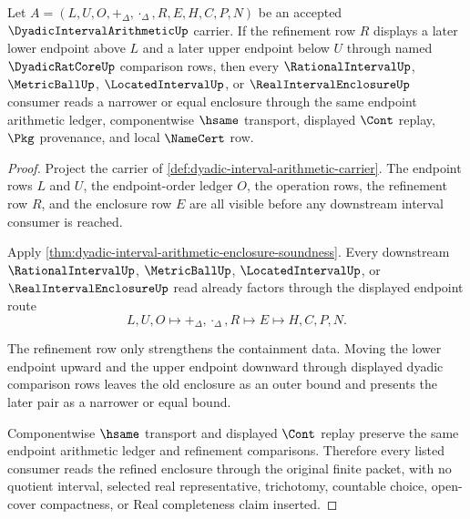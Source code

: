 \begin{theorem}\label{thm:dyadic-interval-arithmetic-refinement-monotonicity}
Let $A=(L,U,O,+_\Delta,\cdot_\Delta,R,E,H,C,P,N)$ be an accepted $\DyadicIntervalArithmeticUp$ carrier. If the refinement row $R$ displays a later lower endpoint above $L$ and a later upper endpoint below $U$ through named $\DyadicRatCoreUp$ comparison rows, then every $\RationalIntervalUp$, $\MetricBallUp$, $\LocatedIntervalUp$, or $\RealIntervalEnclosureUp$ consumer reads a narrower or equal enclosure through the same endpoint arithmetic ledger, componentwise $\hsame$ transport, displayed $\Cont$ replay, $\Pkg$ provenance, and local $\NameCert$ row.
\end{theorem}
\begin{proof}
Project the carrier of \autoref{def:dyadic-interval-arithmetic-carrier}. The endpoint rows $L$ and $U$, the endpoint-order ledger $O$, the operation rows, the refinement row $R$, and the enclosure row $E$ are all visible before any downstream interval consumer is reached.

Apply \autoref{thm:dyadic-interval-arithmetic-enclosure-soundness}. Every downstream $\RationalIntervalUp$, $\MetricBallUp$, $\LocatedIntervalUp$, or $\RealIntervalEnclosureUp$ read already factors through the displayed endpoint route
$$
L,U,O \longmapsto +_\Delta,\cdot_\Delta,R \longmapsto E \longmapsto H,C,P,N .
$$

The refinement row only strengthens the containment data. Moving the lower endpoint upward and the upper endpoint downward through displayed dyadic comparison rows leaves the old enclosure as an outer bound and presents the later pair as a narrower or equal bound.

Componentwise $\hsame$ transport and displayed $\Cont$ replay preserve the same endpoint arithmetic ledger and refinement comparisons. Therefore every listed consumer reads the refined enclosure through the original finite packet, with no quotient interval, selected real representative, trichotomy, countable choice, open-cover compactness, or Real completeness claim inserted.
\end{proof}


